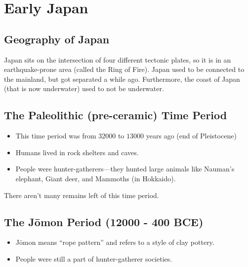 \documentclass[class=article, crop=false]{standalone}
\begin{document}
  \section{Early Japan}
  \subsection{Geography of Japan}
  Japan sits on the intersection of four different tectonic plates, so it is in an earthquake-prone area (called the Ring of Fire). Japan used to be connected to the mainland, but got separated a while ago. Furthermore, the coast of Japan (that is now underwater) used to not be underwater.
  \subsection{The Paleolithic (pre-ceramic) Time Period}
  \begin{itemize}
    \item This time period was from $32000$ to $13000$ years ago (end of Pleistocene)
    \item Humans lived in rock shelters and caves.
    \item People were hunter-gatherers---they hunted large animals like Nauman's elephant, Giant deer, and Mammoths (in Hokkaido).
  \end{itemize}
  There aren't many remains left of this time period.
  \subsection{The J\=omon Period (12000 - 400 BCE)}
  \begin{itemize}
    \item J\=omon means ``rope pattern'' and refers to a style of clay pottery.
    \item People were still a part of hunter-gatherer societies.
  \end{itemize}
\end{document}
